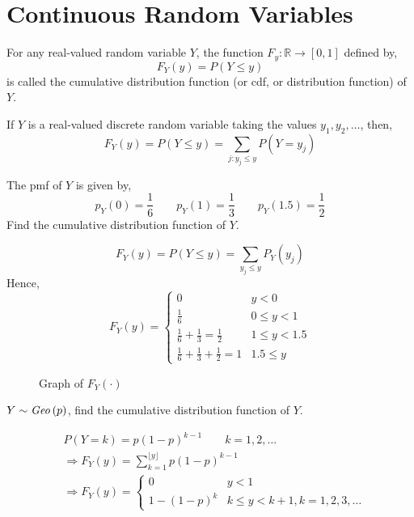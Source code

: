 \section{Continuous Random Variables}
\begin{definition}
For any real-valued random variable $Y$, the function $F_y : \mathbb{R}
\rightarrow [0, 1]$ defined by,
\[
	F_Y(y) = P(Y \leq y)
\]
is called the cumulative distribution function (or cdf, or distribution
function) of $Y$.
\end{definition}
\begin{example}
If $Y$ is a real-valued discrete random variable taking the values $y_1, y_2,
\dots$, then,
\[
    F_Y(y) = P(Y \leq y) 
           = \sum_{j : y_j \leq y} P(Y = y_j)
\]
\end{example}
\begin{example}
The pmf of $Y$ is given by,
\[
    p_Y(0) = \frac{1}{6} \qquad
    p_Y(1) = \frac{1}{3} \qquad
    p_Y(1.5) = \frac{1}{2}
\]
Find the cumulative distribution function of $Y$.
\end{example}
\begin{solution}
\[
    F_Y(y) = P(Y \leq y)
           = \sum_{y_j \leq y} P_Y(y_j)
\]
Hence,
\[
    F_Y(y) = \begin{cases}
        0                                              & y < 0          \\
        \frac{1}{6}                                    & 0 \leq y < 1   \\
        \frac{1}{6}+\frac{1}{3} =\frac{1}{2}           & 1 \leq y < 1.5 \\
        \frac{1}{6}+\frac{1}{3}+\frac{1}{2} = 1        & 1.5 \leq y
    \end{cases}
\]
\begin{figure}[H]
    \centering
    
    \caption{Graph of $F_Y(\cdot)$}
\end{figure}
\end{solution}
\begin{example}
$Y \sim \text{\emph{Geo}}\left( p \right)$, find the cumulative distribution function of $Y$. 
\end{example}
\begin{solution}
\begin{align*}
    & P(Y = k) = p(1 - p)^{k - 1} \qquad k = 1, 2, \dots                     \\
    & \Rightarrow F_Y(y) = \sum_{k = 1}^{\lfloor y \rfloor} p (1 - p)^{k - 1}\\
    & \Rightarrow F_Y(y) = \begin{cases}
        0                  & y < 1                                           \\
        1 - (1 - p)^k      & k \leq y < k + 1, k = 1, 2, 3, \dots
    \end{cases}
\end{align*}
\end{solution}

